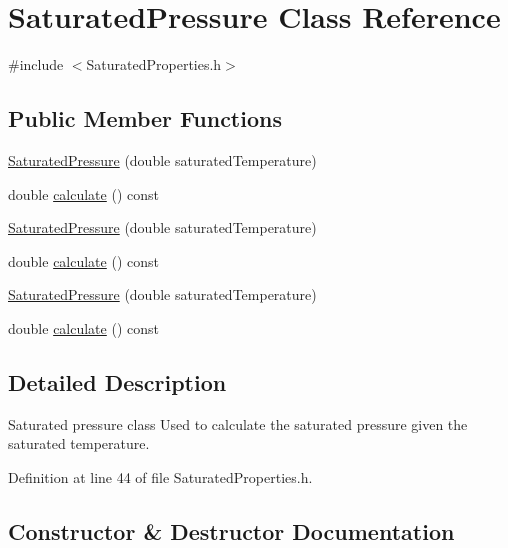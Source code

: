 \hypertarget{class_saturated_pressure}{}\section{Saturated\+Pressure Class Reference}
\label{class_saturated_pressure}


{\ttfamily \#include $<$Saturated\+Properties.\+h$>$}

\subsection*{Public Member Functions}
\begin{DoxyCompactItemize}
\item 
\hyperlink{class_saturated_pressure_a67020b0bb7588c643e12e256fa25e0bc}{Saturated\+Pressure} (double saturated\+Temperature)
\item 
double \hyperlink{class_saturated_pressure_a8ef5357b4f8af1aeaa8dde6ae05b9daa}{calculate} () const
\item 
\hyperlink{class_saturated_pressure_a67020b0bb7588c643e12e256fa25e0bc}{Saturated\+Pressure} (double saturated\+Temperature)
\item 
double \hyperlink{class_saturated_pressure_a8ef5357b4f8af1aeaa8dde6ae05b9daa}{calculate} () const
\item 
\hyperlink{class_saturated_pressure_a67020b0bb7588c643e12e256fa25e0bc}{Saturated\+Pressure} (double saturated\+Temperature)
\item 
double \hyperlink{class_saturated_pressure_a8ef5357b4f8af1aeaa8dde6ae05b9daa}{calculate} () const
\end{DoxyCompactItemize}


\subsection{Detailed Description}
Saturated pressure class Used to calculate the saturated pressure given the saturated temperature. 

Definition at line 44 of file Saturated\+Properties.\+h.



\subsection{Constructor \& Destructor Documentation}
\mbox{\label{class_saturated_pressure_a67020b0bb7588c643e12e256fa25e0bc}} 
